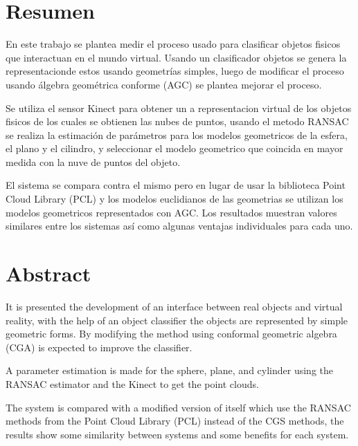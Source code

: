 
\chapter{Resumen}
En este trabajo se plantea medir el proceso usado para clasificar objetos fisicos que interactuan en el mundo virtual. Usando un clasificador objetos se genera la representacionde estos usando geometrías simples, luego de modificar el proceso usando álgebra geométrica conforme (AGC) se plantea mejorar el proceso.


Se utiliza el sensor Kinect para obtener un a representacion virtual de los objetos fisicos de los cuales se obtienen las nubes de puntos, usando el metodo RANSAC se realiza la estimación de parámetros para los modelos geometricos de la esfera, el plano y el cilindro, y seleccionar el modelo geometrico que coincida en mayor medida con la nuve de puntos del objeto.

El sistema se compara contra el mismo pero en lugar de usar la biblioteca Point Cloud Library (PCL) y los modelos euclidianos de las geometrias se utilizan los modelos geometricos representados con AGC. Los resultados muestran valores similares entre los sistemas así como algunas ventajas individuales para cada uno.
 

\chapter{Abstract}
It is presented the development of an interface between real objects and virtual reality, with the help of an object classifier the objects are represented by simple geometric forms.  By modifying the method using conformal geometric algebra (CGA) is expected to improve the classifier.

A parameter estimation is made for the sphere, plane, and cylinder using the RANSAC estimator and the Kinect to get the point clouds.

The system is compared with a modified version of itself which use the RANSAC methods from the Point Cloud Library (PCL) instead of the CGS methods, the results show some similarity between systems and some benefits for each system.

